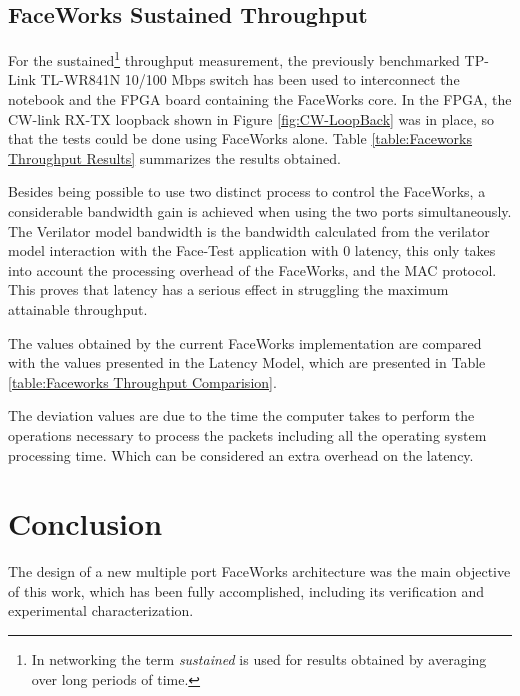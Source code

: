 \documentclass[conference]{IEEEtran}
\begin{document}
\subsection{FaceWorks Sustained Throughput}


For the sustained\footnote{In networking the term {\it sustained} is used for results obtained by averaging over long periods of time.} throughput measurement, the previously benchmarked TP-Link TL-WR841N 10/100 Mbps switch has been used to interconnect the notebook and the FPGA board containing the FaceWorks core. In the FPGA, the CW-link RX-TX loopback shown in Figure \ref{fig:CW-LoopBack} was in place, so that the tests could be done using FaceWorks alone. Table \ref{table:Faceworks Throughput Results} summarizes the results obtained.



Besides being possible to use two distinct process to control the FaceWorks, a considerable bandwidth gain is achieved when using the two ports simultaneously. 
The Verilator model bandwidth is the bandwidth calculated from the verilator model interaction with the Face-Test application with 0 latency, this only takes into account the processing overhead of the FaceWorks, and the MAC protocol. This proves that latency has a serious effect in struggling the maximum attainable throughput.



The values obtained by the current FaceWorks implementation are compared with the values presented in the Latency Model, which are presented in Table \ref{table:Faceworks Throughput Comparision}.

The deviation values are due to the time the computer takes to perform the operations necessary to process the packets including all the operating system processing time. Which can be considered an extra overhead on the latency.

\section{Conclusion}

The design of a new multiple port FaceWorks architecture was the main objective of this work, which has been fully accomplished, including its verification and experimental characterization. 
\end{document}
